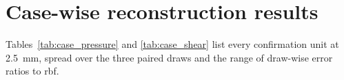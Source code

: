 \documentclass[12pt,a4paper]{article}
\newcommand{\RBF}{\ac{rbf}\xspace}
\theoremstyle{definition}
\numberwithin{equation}{section}
\begin{document}
\section{Case-wise reconstruction results}
\label{app:casewise}
Tables~\ref{tab:case_pressure} and \ref{tab:case_shear} list every confirmation unit at 2.5~mm, spread over the three paired draws and the range of draw-wise error ratios to \RBF.




\newpage


\end{document}
